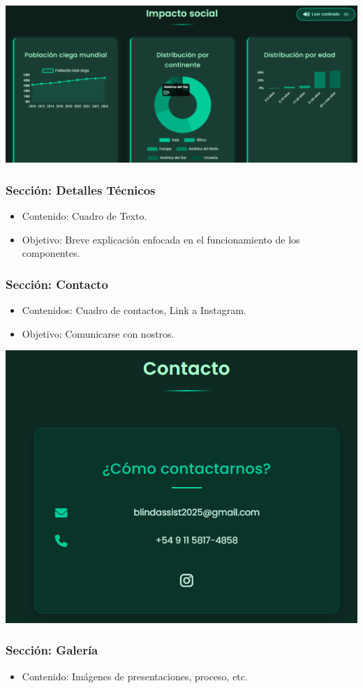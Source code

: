 \documentclass[12pt,a4paper]{article}
\begin{document}
\includegraphics[width=\linewidth]{Carpeta tecnica/grfcs.png}

\subsubsection*{ Sección: Detalles Técnicos}
\begin{itemize}
    \item Contenido: Cuadro de Texto.
    \item Objetivo: Breve explicación enfocada en el funcionamiento de los componentes. 
\end{itemize}

\subsubsection*{Sección: Contacto }
\begin{itemize}
    \item Contenidos: Cuadro de contactos, Link a Instagram.
    \item Objetivo: Comunicarse con nostros.
\end{itemize}

    \includegraphics[width=0.5\linewidth]{Carpeta tecnica/cntacto.png}


\subsubsection*{Sección: Galería}
\begin{itemize}
    \item Contenido: Imágenes de presentaciones, proceso, etc.
\end{itemize}
\end{document}
